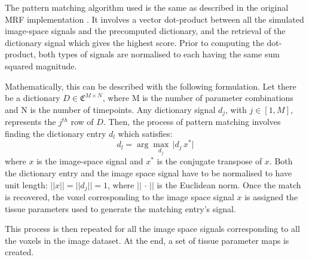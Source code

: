 The pattern matching algorithm used is the same as described in the original MRF implementation \cite{Ma2013}.
It involves a vector dot-product between all the simulated image-space signals and the precomputed dictionary, and the retrieval of the dictionary signal which gives the highest score.
Prior to computing the dot-product, both types of signals are normalised to each having the same sum squared magnitude.

\hfill

Mathematically, this can be described with the following formulation.
Let there be a dictionary $D \in \mathfrak{C}^{M \times N}$, where M is the number of parameter combinations and N is the number of timepoints.
Any dictionary signal $d_j$, with $j \in [1,M]$, represents the $j^{th}$ row of $D$.
Then, the process of pattern matching involves finding the dictionary entry $d_l$ which satisfies:
\begin{equation}
    d_l = \arg\!\max_{d_j} \, \lvert d_j \, x^* \rvert
\end{equation}
where $x$ is the image-space signal and $x^*$ is the conjugate transpose of $x$.
Both the dictionary entry and the image space signal have to be normalised to have unit length: $\lvert \lvert x \rvert \rvert = \lvert \lvert d_j \rvert \rvert = 1$, where $\lvert \lvert \, \cdot \, \rvert \rvert$ is the Euclidean norm.
Once the match is recovered, the voxel corresponding to the image space signal $x$ is assigned the tissue parameters used to generate the matching entry's signal.

\hfill

This process is then repeated for all the image space signals corresponding to all the voxels in the image dataset.
At the end, a set of tissue parameter maps is created.